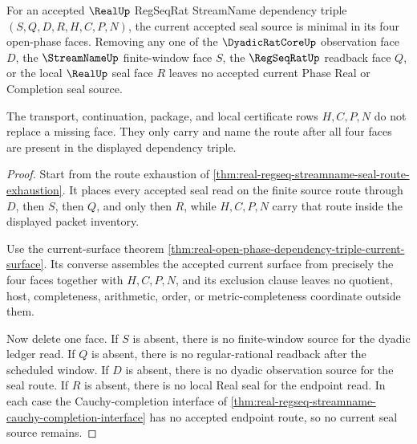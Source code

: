 \begin{theorem}
\label{thm:real-regseq-streamname-seal-source-minimality}
For an accepted $\RealUp$ RegSeqRat StreamName dependency triple
$(S,Q,D,R,H,C,P,N)$, the current accepted seal source is minimal in its four
open-phase faces. Removing any one of the $\DyadicRatCoreUp$ observation face
$D$, the $\StreamNameUp$ finite-window face $S$, the $\RegSeqRatUp$ readback
face $Q$, or the local $\RealUp$ seal face $R$ leaves no accepted current
Phase Real or Completion seal source.

The transport, continuation, package, and local certificate rows $H,C,P,N$
do not replace a missing face. They only carry and name the route after all
four faces are present in the displayed dependency triple.
\end{theorem}
\begin{proof}
Start from the route exhaustion of
\autoref{thm:real-regseq-streamname-seal-route-exhaustion}. It places every
accepted seal read on the finite source route through $D$, then $S$, then $Q$,
and only then $R$, while $H,C,P,N$ carry that route inside the displayed packet
inventory.

Use the current-surface theorem
\autoref{thm:real-open-phase-dependency-triple-current-surface}. Its
converse assembles the accepted current surface from precisely the four
faces together with $H,C,P,N$, and its exclusion clause leaves no quotient,
host, completeness, arithmetic, order, or metric-completeness coordinate
outside them.

Now delete one face. If $S$ is absent, there is no finite-window source for
the dyadic ledger read. If $Q$ is absent, there is no regular-rational
readback after the scheduled window. If $D$ is absent, there is no dyadic
observation source for the seal route. If $R$ is absent, there is no local Real seal for
the endpoint read. In each case the Cauchy-completion interface of
\autoref{thm:real-regseq-streamname-cauchy-completion-interface} has no
accepted endpoint route, so no current seal source remains.
\end{proof}

